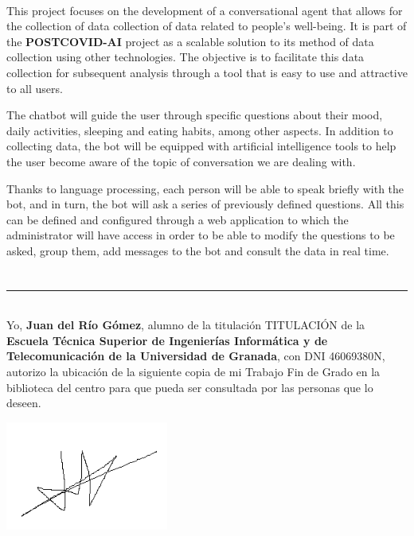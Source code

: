 \vspace{0.7cm}
\\

This project focuses on the development of a conversational agent that allows for the collection of data
collection of data related to people's well-being. It is part of the {\bfseries POSTCOVID-AI} project as a scalable solution to its method of data collection using other technologies. The objective is to facilitate this data collection for subsequent analysis through a tool that is easy to use and attractive to all users.\vspace{0.3cm}

The chatbot will guide the user through specific questions about their mood, daily activities, sleeping and eating habits, among other aspects. In addition to collecting data, the bot will be equipped with artificial intelligence tools to help the user become aware of the topic of conversation we are dealing with.\vspace{0.3cm}

Thanks to language processing, each person will be able to speak briefly with the bot, and in turn, the bot will ask a series of previously defined questions. All this can be defined and configured through a web application to which the administrator will have access in order to be able to modify the questions to be asked, group them, add messages to the bot and consult the data in real time.

\chapter*{}
\thispagestyle{empty}

\noindent\rule[-1ex]{\textwidth}{2pt}\\[4.5ex]

Yo, \textbf{Juan del Río Gómez}, alumno de la titulación TITULACIÓN de la \textbf{Escuela Técnica Superior
de Ingenierías Informática y de Telecomunicación de la Universidad de Granada}, con DNI 46069380N, autorizo la ubicación de la siguiente copia de mi Trabajo Fin de Grado en la biblioteca del centro para que pueda ser consultada por las personas que lo deseen.

\vspace{5cm}

\includegraphics[width=0.4\textwidth]{imagenes/firma.png}\\[0.5cm]

